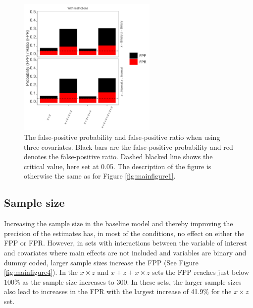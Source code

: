 \begin{figure}[hbt!]
\includegraphics[width=0.6\textwidth]{R/Analysis/Result/Figures/Figure1C_with.jpeg}
\centering
\caption{The false-positive probability and false-positive ratio when using three covariates. Black bars are the false-positive probability and red denotes the false-positive ratio. Dashed blacked line shows the critical value, here set at 0.05. The description of the figure is otherwise the same as for Figure \ref{fig:mainfigure1}.}
\label{fig:mainfigure2}
\end{figure}

\subsection{Sample size}
Increasing the sample size in the baseline model and thereby improving the precision of the estimates has, in most of the conditions, no effect on either the FPP or FPR. However, in sets with interactions between the variable of interest and covariates where main effects are not included and variables are binary and dummy coded, larger sample sizes increase the FPP (See Figure \ref{fig:mainfigure4}). In the $x \times z$ and $x + z+ x \times z$ sets the FPP reaches just below 100\% as the sample size increases to 300. In these sets, the larger sample sizes also lead to increases in the FPR with the largest increase of 41.9\% for the $x \times z$ set.  


